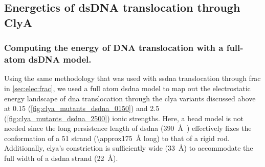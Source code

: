\subsection{Energetics of {dsDNA} translocation through {ClyA}}
%
\label{sec:elec:clya:dna}

\subsubsection{Computing the energy of DNA translocation with a full-atom {dsDNA} model.}
%

Using the same methodology that was used with \gls{ssdna} translocation through \gls{frac} in
\cref{sec:elec:frac}, we used a full atom \gls{dsdna} model to map out the electrostatic energy landscape of
\gls{dna} translocation through the \gls{clya} variants discussed above at \SI{0.15}{\Molar}
(\cref{fig:clya_mutants_dsdna_0150}) and \SI{2.5}{\Molar} (\cref{fig:clya_mutants_dsdna_2500}) ionic
strengths. Here, a bead model is not needed since the long persistence length of \gls{dsdna}
(\SI{390}{\angstrom}~\cite{Gross-2011}) effectively fixes the conformation of a \SI{51}{\bp} strand
(\SI{\approx175}{\angstrom} long) to that of a rigid rod. Additionally, \gls{clya}'s \transi{} constriction is
sufficiently wide (\SI{33}{\angstrom}) to accommodate the full width of a \gls{dsdna} strand
(\SI{22}{\angstrom}).


